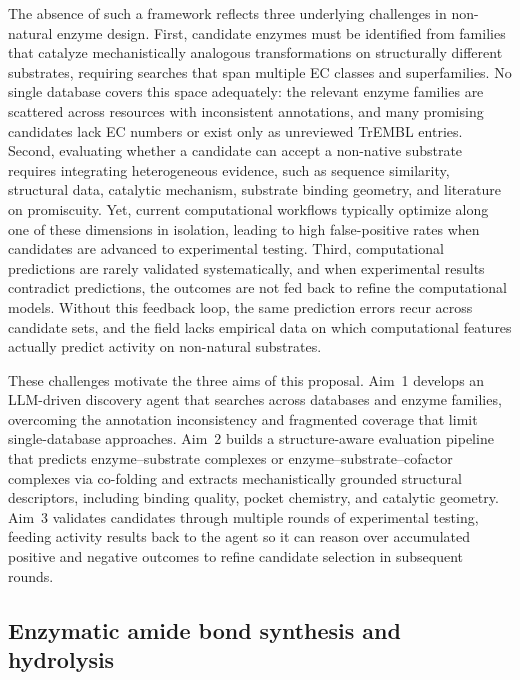 \documentclass[12pt]{article}
\begin{document}
The absence of such a framework reflects three underlying challenges in non-natural enzyme design. First, candidate enzymes must be identified from families that catalyze mechanistically analogous transformations on structurally different substrates, requiring searches that span multiple EC classes and superfamilies. No single database covers this space adequately: the relevant enzyme families are scattered across resources with inconsistent annotations, and many promising candidates lack EC numbers or exist only as unreviewed TrEMBL entries. Second, evaluating whether a candidate can accept a non-native substrate requires integrating heterogeneous evidence, such as sequence similarity, structural data, catalytic mechanism, substrate binding geometry, and literature on promiscuity. Yet, current computational workflows typically optimize along one of these dimensions in isolation, leading to high false-positive rates when candidates are advanced to experimental testing. Third, computational predictions are rarely validated systematically, and when experimental results contradict predictions, the outcomes are not fed back to refine the computational models. Without this feedback loop, the same prediction errors recur across candidate sets, and the field lacks empirical data on which computational features actually predict activity on non-natural substrates.

These challenges motivate the three aims of this proposal. Aim~1 develops an LLM-driven discovery agent that searches across databases and enzyme families, overcoming the annotation inconsistency and fragmented coverage that limit single-database approaches. Aim~2 builds a structure-aware evaluation pipeline that predicts enzyme--substrate complexes or enzyme--substrate--cofactor complexes via co-folding and extracts mechanistically grounded structural descriptors, including binding quality, pocket chemistry, and catalytic geometry. Aim~3 validates candidates through multiple rounds of experimental testing, feeding activity results back to the agent so it can reason over accumulated positive and negative outcomes to refine candidate selection in subsequent rounds.

\subsection{Enzymatic amide bond synthesis and hydrolysis}
\end{document}

